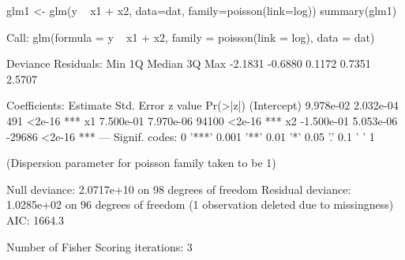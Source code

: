 \begin{Schunk}
\begin{Sinput}
 glm1 <- glm(y ~ x1 + x2, data=dat, family=poisson(link=log))
 summary(glm1)
\end{Sinput}
\begin{Soutput}
Call:
glm(formula = y ~ x1 + x2, family = poisson(link = log), data = dat)

Deviance Residuals: 
    Min       1Q   Median       3Q      Max  
-2.1831  -0.6880   0.1172   0.7351   2.5707  

Coefficients:
              Estimate Std. Error z value Pr(>|z|)    
(Intercept)  9.978e-02  2.032e-04     491   <2e-16 ***
x1           7.500e-01  7.970e-06   94100   <2e-16 ***
x2          -1.500e-01  5.053e-06  -29686   <2e-16 ***
---
Signif. codes:  0 '***' 0.001 '**' 0.01 '*' 0.05 '.' 0.1 ' ' 1

(Dispersion parameter for poisson family taken to be 1)

    Null deviance: 2.0717e+10  on 98  degrees of freedom
Residual deviance: 1.0285e+02  on 96  degrees of freedom
  (1 observation deleted due to missingness)
AIC: 1664.3

Number of Fisher Scoring iterations: 3
\end{Soutput}
\end{Schunk}

